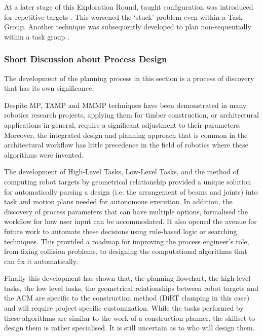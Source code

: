 At a later stage of this Exploration Round, taught configuration was introduced for repetitive targets . This worsened the ‘stuck’ problem even within a Task Group. Another technique was subsequently developed to plan non-sequentially within a task group .

\subsubsection{Short Discussion about Process Design}
\label{subsubsection:exploration-3-short-discussion-about-process-design}

The development of the planning process in this section is a process of discovery that has its own significance. 

Despite MP, TAMP and MMMP techniques have been demonstrated in many robotics research projects, applying them for timber construction, or architectural applications in general, require a significant adjustment to their parameters. Moreover, the integrated design and planning approach that is common in the architectural workflow has little precedence in the field of robotics where these algorithms were invented.

The development of High-Level Tasks, Low-Level Tasks, and the method of computing robot targets by geometrical relationship provided a unique solution for automatically parsing a design (i.e. the arrangement of beams and joints) into task and motion plans needed for autonomous execution. In addition, the discovery of process parameters that can have multiple options, formalised the workflow for how user input can be accommodated. It also opened the avenue for future work to automate these decisions using rule-based logic or searching techniques. This provided a roadmap for improving the process engineer’s role, from fixing collision problems, to designing the computational algorithms that can fix it automatically. 

Finally this development has shown that, the planning flowchart, the high level tasks, the low level tasks, the geometrical relationships between robot targets and the ACM are specific to the construction method (DiRT clamping in this case) and will require project specific customization. While the tasks performed by these algorithms are similar to the work of a construction planner, the skillset to design them is rather specialised. It is still uncertain as to who will design them.

